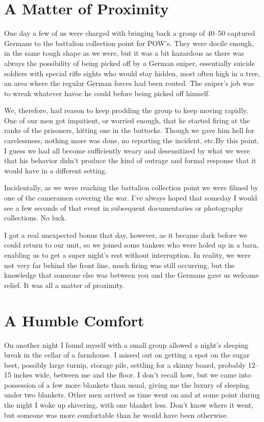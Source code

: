 \documentclass[../m3y]{subfiles}
\begin{document}
\section{A Matter of Proximity}
One day a few of us were charged with bringing back a group of 40--50 captured Germans to the battalion collection point for POW's. They were docile enough, in the same tough shape as we were, but it was a bit hazardous as there was always the possibility of being picked off by a German sniper, essentially suicide soldiers with special rifle sights who would stay hidden, most often high in a tree, an area where the regular German forces had been routed. The sniper's job was to wreak whatever havoc he could before being picked off himself.

We, therefore, had reason to keep prodding the group to keep moving rapidly. One of our men got impatient, or worried enough, that he started firing at the ranks of the prisoners, hitting one in the buttocks. Though we gave him hell for carelessness, nothing more was done, no reporting the incident, etc.\@ By this point, I guess we had all become sufficiently weary and desensitized by what we were that his behavior didn't produce the kind of outrage and formal response that it would have in a different setting.

Incidentally, as we were reaching the battalion collection point we were filmed by one of the cameramen covering the war. I've always hoped that someday I would see a few seconds of that event in subsequent documentaries or photography collections. No luck.

I got a real unexpected bonus that day, however, as it became dark before we could return to our unit, so we joined some tankers who were holed up in a barn, enabling us to get a super night's rest without interruption. In reality, we were not very far behind the front line, much firing was still occurring, but the knowledge that someone else was between you and the Germans gave us welcome relief. It was all a matter of proximity.


\section{A Humble Comfort}
On another night I found myself with a small group allowed a night's sleeping break in the cellar of a farmhouse. I missed out on getting a spot on the sugar beet, possibly large turnip, storage pile, settling for a skinny board, probably 12--15 inches wide, between me and the floor. I don't recall how, but we came into possession of a few more blankets than usual, giving me the luxury of sleeping under two blankets. Other men arrived as time went on and at some point during the night I woke up shivering, with one blanket less. Don't know where it went, but someone was more comfortable than he would have been otherwise.
\end{document}
